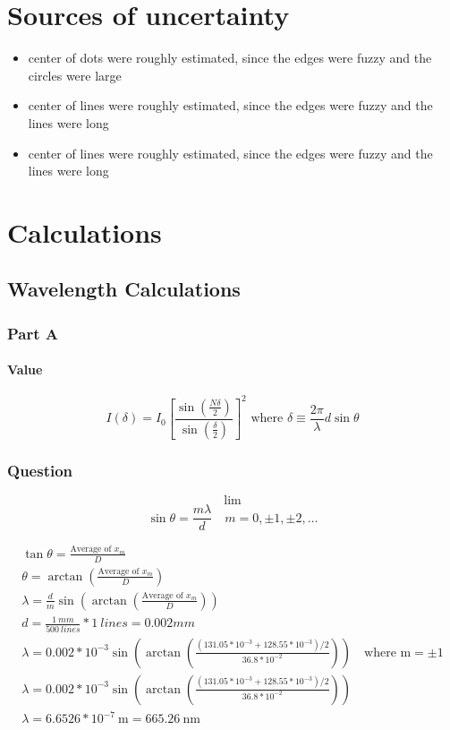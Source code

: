 \documentclass{report}
\begin{document}
\chapter{Sources of uncertainty}
\begin{itemize}
    \item center of dots were roughly estimated, since the edges were fuzzy and the circles were large
    \item center of lines were roughly estimated, since the edges were fuzzy and the lines were long
    \item center of lines were roughly estimated, since the edges were fuzzy and the lines were long
\end{itemize}

\chapter{Calculations}

\section{Wavelength Calculations}
\subsection*{Part A}

\subsubsection*{Value}
\begin{equation}
    I(\delta)=I_{0}\left[\frac{\sin \left(\frac{N \delta}{2}\right)}{\sin \left(\frac{\delta}{2}\right)}\right]^{2} \text { where } \delta \equiv \frac{2 \pi}{\lambda} d \sin \theta 
\end{equation}
\label{Question}

\subsection*{Question}
$$
\lim
$$
$$
    \sin \theta=\frac{m \lambda}{d} \quad m=0, \pm 1, \pm 2, \ldots
$$

$$
\begin{gathered}
    \tan \theta  = \frac{\text{Average of $x_m$}}{D} \\
    \theta = \arctan \left( \frac{\text{Average of $x_m$}}{D} \right) \\
    \lambda = \frac{d}{m}\sin \left(\arctan \left( \frac{\text{Average of $x_m$}}{D} \right)\right) \\
    d = \frac{1 \ mm}{500 \ lines} * 1 \ lines = 0.002 mm \\
    \lambda = 0.002*10^{-3}\sin \left(\arctan \left( \frac{(131.05 * 10^{-3} + 128.55*10^{-3}) / 2}{36.8*10^{-2}} \right)\right) \quad \text{where m} = \pm 1 \\
    \lambda = 0.002*10^{-3}\sin \left(\arctan \left( \frac{(131.05 * 10^{-3} + 128.55*10^{-3}) / 2}{36.8*10^{-2}} \right)\right) \\
    \lambda = 6.6526*10^{-7}  \ \mathrm{m} = 665.26 \  \mathrm{nm} \\
\end{gathered}
$$
\end{document}
